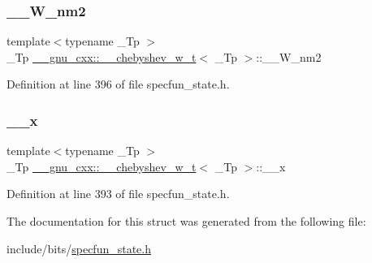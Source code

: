\subsubsection{\texorpdfstring{\+\_\+\+\_\+\+W\+\_\+nm2}{\_\_W\_nm2}}
{\footnotesize\ttfamily template$<$typename \+\_\+\+Tp $>$ \\
\+\_\+\+Tp \hyperlink{struct____gnu__cxx_1_1____chebyshev__w__t}{\+\_\+\+\_\+gnu\+\_\+cxx\+::\+\_\+\+\_\+chebyshev\+\_\+w\+\_\+t}$<$ \+\_\+\+Tp $>$\+::\+\_\+\+\_\+\+W\+\_\+nm2}



Definition at line 396 of file specfun\+\_\+state.\+h.

\mbox{\label{struct____gnu__cxx_1_1____chebyshev__w__t_a812c1414d20763ecd27f95c244a727eb}} 
\subsubsection{\texorpdfstring{\+\_\+\+\_\+x}{\_\_x}}
{\footnotesize\ttfamily template$<$typename \+\_\+\+Tp $>$ \\
\+\_\+\+Tp \hyperlink{struct____gnu__cxx_1_1____chebyshev__w__t}{\+\_\+\+\_\+gnu\+\_\+cxx\+::\+\_\+\+\_\+chebyshev\+\_\+w\+\_\+t}$<$ \+\_\+\+Tp $>$\+::\+\_\+\+\_\+x}



Definition at line 393 of file specfun\+\_\+state.\+h.



The documentation for this struct was generated from the following file\+:\begin{DoxyCompactItemize}
\item 
include/bits/\hyperlink{specfun__state_8h}{specfun\+\_\+state.\+h}\end{DoxyCompactItemize}
